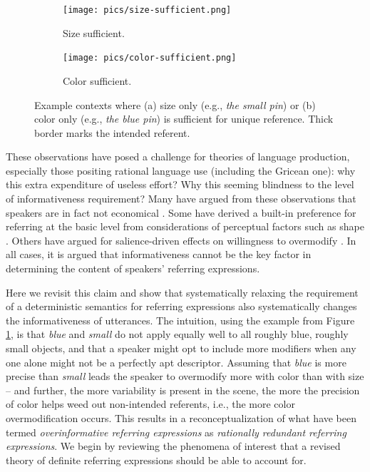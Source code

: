 \documentclass[11pt]{article}
\newcommand{\figref}[1]{Figure \ref{#1}}
\begin{document}
\begin{figure}
\begin{subfigure}{.5\textwidth}
\texttt{[image: pics/size-sufficient.png]}
\caption{Size sufficient.}
\label{fig:sizesufficient}
\end{subfigure}
\begin{subfigure}{.5\textwidth}
\texttt{[image: pics/color-sufficient.png]}
\caption{Color sufficient.}
\label{fig:colorsufficient}
\end{subfigure}
\caption{Example contexts where (a) size only (e.g., \emph{the small pin}) or (b) color only (e.g., \emph{the blue pin}) is sufficient for unique reference. Thick border marks the intended referent.}
\label{fig:pin}
\end{figure}

These observations have posed a challenge for theories of language production, especially those positing rational language use (including the Gricean one): why this extra expenditure of useless effort? Why this seeming blindness to the level of informativeness requirement? Many have argued from these observations that speakers are in fact not economical \cite{Engelhardt2006, Pechmann1989}. Some have derived a built-in preference for referring at the basic level from considerations of perceptual factors such as shape \cite{Rosch1976, Rosch1973, murphy1982basic}. Others have argued for salience-driven effects on willingness to overmodify \cite{Gatt2014, Westerbeek2015}. In all cases, it is argued that informativeness cannot be the key factor in determining the content of speakers' referring expressions. 

Here we revisit this claim and show that systematically relaxing the requirement of a deterministic semantics for referring expressions also systematically changes the informativeness of utterances. The intuition, using the example from \figref{fig:sizesufficient}, is that \emph{blue} and \emph{small} do not apply equally well to all roughly blue, roughly small objects, and that a speaker might opt to include more modifiers when any one alone might not be a perfectly apt descriptor. Assuming that \emph{blue} is more precise than \emph{small} leads the speaker to overmodify more with color than with size -- and further, the more variability is present in the scene, the more the precision of color helps weed out non-intended referents, i.e., the more color overmodification  occurs. This results in a reconceptualization of what have been termed \emph{overinformative referring expressions} as \emph{rationally redundant referring expressions}. We begin by reviewing the phenomena of interest that a revised theory of definite referring expressions should be able to account for. 
\end{document}
